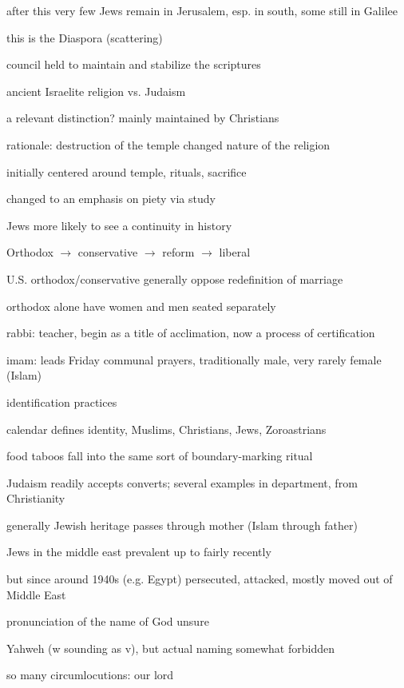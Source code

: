 \documentclass[12pt]{article}
\begin{document}
after this very few Jews remain in Jerusalem, esp. in south, some still in Galilee

this is the Diaspora (scattering)

council held to maintain and stabilize the scriptures

\noindent
ancient Israelite religion vs. Judaism

a relevant distinction? mainly maintained by Christians

rationale: destruction of the temple changed nature of the religion

initially centered around temple, rituals, sacrifice

changed to an emphasis on piety via study

Jews more likely to see a continuity in history

\noindent
Orthodox $\to$ conservative $\to$ reform $\to$ liberal

U.S. orthodox/conservative generally oppose redefinition of marriage

orthodox alone have women and men seated separately

rabbi: teacher, begin as a title of acclimation, now a process of certification

imam: leads Friday communal prayers, traditionally male, very rarely female (Islam)

\noindent
identification practices

calendar defines identity, Muslims, Christians, Jews, Zoroastrians

food taboos fall into the same sort of boundary-marking ritual

Judaism readily accepts converts; several examples in department, from Christianity

generally Jewish heritage passes through mother (Islam through father)

\noindent
Jews in the middle east prevalent up to fairly recently

but since around 1940s (e.g. Egypt) persecuted, attacked, mostly moved out of Middle East

\noindent
pronunciation of the name of God unsure

Yahweh (w sounding as v), but actual naming somewhat forbidden

so many circumlocutions: our lord
\end{document}
